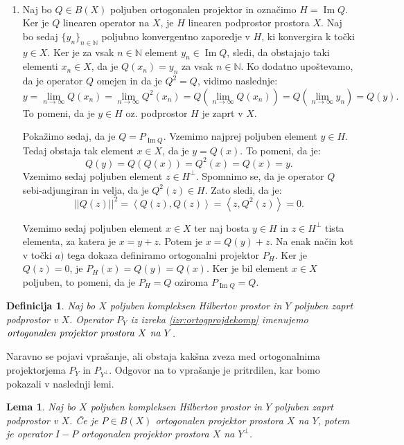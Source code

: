 \documentclass[12pt,a4paper,oneside,fleqn,openany]{book}
\newtheorem{lema}[izrek]{Lema}
\newtheorem{definicija}[izrek]{Definicija}
\newcommand{\eopf}{\raisebox{0.8ex}{\framebox{}}} %
\newenvironment{dokaz}%
{\noindent{\bf Dokaz.}\ }%
{\hfill\eopf\par\bigskip}%
\newcommand{\N}{\mathbb{N}}
\newcommand{\abs}[1]{\ensuremath{\lvert #1 \rvert}}
\newcommand{\norm}[1]{\abs{\abs{#1}}}
\newcommand{\pojem}[1]{\ensuremath{\emph{#1}}}
\newcommand{\Sp}[2]{\ensuremath{\left<#1, #2\right>}}
\begin{document}
\begin{dokaz}
\begin{enumerate}
		Za konec preverimo, da je operator $P_Y$ ortogonalen projektor. Naj bo $x\in X$ poljuben element in naj bosta elementa $y\in Y$ in $z\in Y^\bot$ tista, za katera je $x = y + z$. Tedaj je: $$P_Y^2(x)=P_Y(P_Y(x))=P_Y(y)=y=P_Y(x).$$ To pomeni, da je $P_Y^2 = P_Y$ in ker je operator $P_Y$ sebi-adjungiran, sledi, da je tudi ortogonalen projektor.
		
		\item Naj bo $Q\in B(X)$ poljuben ortogonalen projektor in označimo $H = \operatorname{Im}Q$. Ker je $Q$ linearen operator na $X$, je $H$ linearen podprostor prostora $X$. Naj bo sedaj $\{y_n\}_{n\in\N}$ poljubno konvergentno zaporedje v $H$, ki konvergira k točki $y\in X$. Ker je za vsak $n\in\N$ element $y_n\in \operatorname{Im}Q$, sledi, da obstajajo taki elementi $x_n\in X$, da je $Q(x_n) = y_n$ za vsak $n\in\N$. Ko dodatno upoštevamo, da je operator $Q$ omejen in da je $Q^2 = Q$, vidimo naslednje:
		$$y = \lim_{n\to \infty}Q(x_n) = \lim_{n\to \infty}Q^2(x_n) = Q(\lim_{n\to \infty}Q(x_n)) = Q(\lim_{n\to \infty}y_n) = Q(y).$$ To pomeni, da je $y\in H$ oz. podprostor $H$ je zaprt v $X$.
		
		Pokažimo sedaj, da je $Q = P_{\operatorname{Im}Q}$. Vzemimo najprej poljuben element $y\in H$. Tedaj obstaja tak element $x\in X$, da je $y = Q(x)$. To pomeni, da je: $$Q(y) = Q(Q(x)) = Q^2(x) = Q(x)=y.$$
		Vzemimo sedaj poljuben element $z\in H^\bot$. Spomnimo se, da je operator $Q$ sebi-adjungiran in velja, da je $Q^2(z)\in H$. Zato sledi, da je: $$\norm{Q(z)}^2 = \Sp{Q(z)}{Q(z)} = \Sp{z}{Q^2(z)} = 0.$$
		
		Vzemimo sedaj poljuben element $x\in X$ ter naj bosta $y\in H$ in $z\in H^\bot$ tista elementa, za katera je $x = y + z$. Potem je $x = Q(y) + z$. Na enak način kot v točki $a)$ tega dokaza definiramo ortogonalni projektor $P_H$. Ker je $Q(z)=0$, je $P_H(x) = Q(y) = Q(x)$. Ker je bil element $x\in X$ poljuben, to pomeni, da je $P_H = Q$ oziroma $P_{\operatorname{Im}Q} = Q$.
	\end{enumerate}
\end{dokaz}
\begin{definicija}
	\label{def:ortogprojnaX}
	Naj bo $X$ poljuben kompleksen Hilbertov prostor in $Y$ poljuben zaprt podprostor v $X$. Operator $P_Y$ iz izreka \ref{izr:ortogprojdekomp} imenujemo \pojem{ortogonalen projektor prostora $X$ na $Y$}.
\end{definicija}

Naravno se pojavi vprašanje, ali obstaja kakšna zveza med ortogonalnima projektorjema $P_Y$ in $P_{Y^\bot}$. Odgovor na to vprašanje je pritrdilen, kar bomo pokazali v naslednji lemi.
\begin{lema}
	\label{lem:ortogproj2}
	Naj bo $X$ poljuben kompleksen Hilbertov prostor in $Y$ poljuben zaprt podprostor v $X$. Če je $P\in B(X)$ ortogonalen projektor prostora $X$ na $Y$, potem je operator $I - P$ ortogonalen projektor prostora $X$ na $Y^\bot$.
\end{lema}
\end{document}
